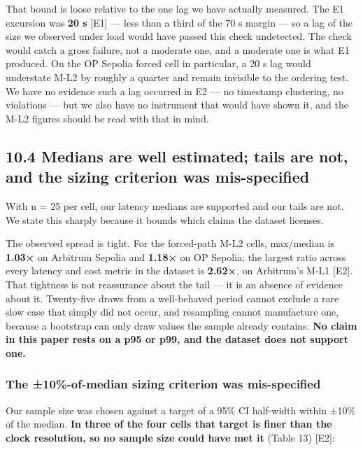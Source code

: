\documentclass[conference]{IEEEtran}
\renewcommand{\_}{\textunderscore\allowbreak}
\begin{document}
That bound is loose relative to the one lag we have actually measured.
The E1 excursion was \textbf{20 s} {[}E1{]} --- less than a third of the
70 s margin --- so a lag of the size we observed under load would have
passed this check undetected. The check would catch a gross failure, not
a moderate one, and a moderate one is what E1 produced. On the OP
Sepolia forced cell in particular, a 20 s lag would understate M-L2 by
roughly a quarter and remain invisible to the ordering test. We have no
evidence such a lag occurred in E2 --- no timestamp clustering, no
violations --- but we also have no instrument that would have shown it,
and the M-L2 figures should be read with that in mind.

\subsection{10.4 Medians are well estimated; tails are not, and the
sizing criterion was
mis-specified}\label{medians-are-well-estimated-tails-are-not-and-the-sizing-criterion-was-mis-specified}

With n = 25 per cell, our latency medians are supported and our tails
are not. We state this sharply because it bounds which claims the
dataset licenses.

The observed spread is tight. For the forced-path M-L2 cells, max/median
is \textbf{1.03×} on Arbitrum Sepolia and \textbf{1.18×} on OP Sepolia;
the largest ratio across every latency and cost metric in the dataset is
\textbf{2.62×}, on Arbitrum's M-L1 {[}E2{]}. That tightness is not
reassurance about the tail --- it is an absence of evidence about it.
Twenty-five draws from a well-behaved period cannot exclude a rare slow
case that simply did not occur, and resampling cannot manufacture one,
because a bootstrap can only draw values the sample already contains.
\textbf{No claim in this paper rests on a p95 or p99, and the dataset
does not support one.}

\subsubsection{The ±10\%-of-median sizing criterion was
mis-specified}\label{the-10-of-median-sizing-criterion-was-mis-specified}

Our sample size was chosen against a target of a 95\% CI half-width
within ±10\% of the median. \textbf{In three of the four cells that
target is finer than the clock resolution, so no sample size could have
met it} (Table 13) {[}E2{]}:
\end{document}
